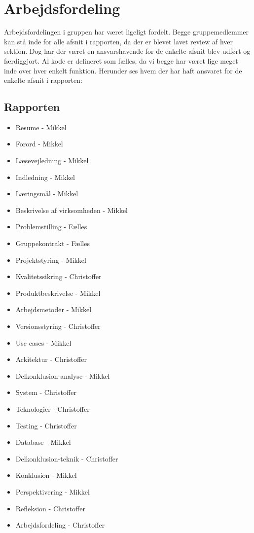 \section{Arbejdsfordeling}
Arbejdsfordelingen i gruppen har været ligeligt fordelt. Begge gruppemedlemmer kan stå inde for alle afsnit i rapporten,
da der er blevet lavet review af hver sektion. 
Dog har der været en ansvarshavende for de enkelte afsnit blev udført og færdiggjort.
Al kode er defineret som fælles, da vi begge har været lige meget inde over hver enkelt funktion.
Herunder ses hvem der har haft ansvaret for de enkelte afsnit i rapporten:
\subsection{Rapporten}
\begin{itemize}
    \item{Resume - Mikkel}
    \item{Forord - Mikkel}
    \item{Læsevejledning - Mikkel}
    \item{Indledning - Mikkel}
    \item{Læringsmål - Mikkel}
    \item{Beskrivelse af virksomheden - Mikkel}
    \item{Problemstilling - Fælles}
    \item{Gruppekontrakt - Fælles}
    \item{Projektstyring - Mikkel}
    \item{Kvalitetssikring - Christoffer}
    \item{Produktbeskrivelse - Mikkel}
    \item{Arbejdsmetoder - Mikkel}
    \item{Versionsstyring - Christoffer}
    \item{Use cases - Mikkel}
    \item{Arkitektur - Christoffer}
    \item{Delkonklusion-analyse - Mikkel}
    \item{System - Christoffer}
    \item{Teknologier - Christoffer}
    \item{Testing - Christoffer}
    \item{Database - Mikkel}
    \item{Delkonklusion-teknik - Christoffer}
    \item{Konklusion - Mikkel}
    \item{Perspektivering - Mikkel}
    \item{Refleksion - Christoffer}
    \item{Arbejdsfordeling - Christoffer}
\end{itemize}
